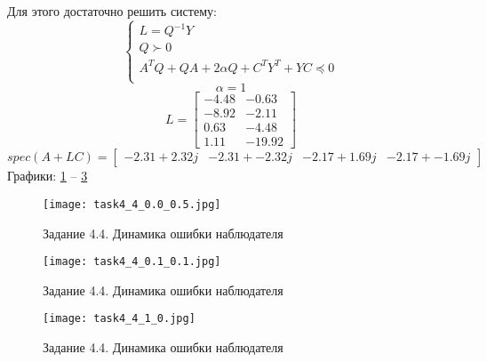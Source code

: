 Для этого достаточно решить систему:
\[
        \begin{cases}
                L = Q^{-1}Y\\
                Q \succ 0 \\
                A^TQ + QA + 2 \alpha Q + C^T Y^T + YC \preccurlyeq 0  \\
        \end{cases} 
\]
\[ \alpha = 1\]
\[L = \begin{bmatrix}
 -4.48 & -0.63\\
 -8.92 & -2.11\\
  0.63 & -4.48\\
  1.11 & -19.92
\end{bmatrix}\]
\[spec(A + LC) = \begin{bmatrix}
 -2.31 + 2.32j & -2.31 + -2.32j & -2.17 + 1.69j & -2.17 + -1.69j
\end{bmatrix}\]
Графики: \ref{fig:task4_4_1} -- \ref{fig:task4_4_3}
\begin{figure}[]
    \centering
    \texttt{[image: task4\_4\_0.0\_0.5.jpg]}
    \caption{Задание 4.4. Динамика ошибки наблюдателя}
    \label{fig:task4_4_1}
\end{figure}

\begin{figure}[]
    \centering
    \texttt{[image: task4\_4\_0.1\_0.1.jpg]}
    \caption{Задание 4.4. Динамика ошибки наблюдателя}
    \label{fig:task4_4_2}
\end{figure}

\begin{figure}[]
    \centering
    \texttt{[image: task4\_4\_1\_0.jpg]}
    \caption{Задание 4.4. Динамика ошибки наблюдателя}
    \label{fig:task4_4_3}
\end{figure}


